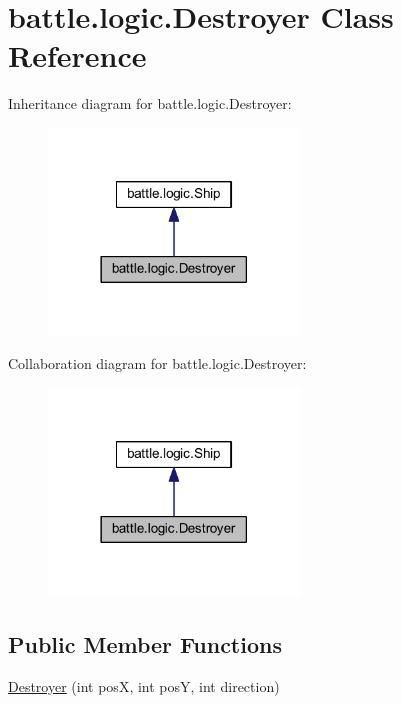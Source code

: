 \hypertarget{classbattle_1_1logic_1_1_destroyer}{}\section{battle.\+logic.\+Destroyer Class Reference}
\label{classbattle_1_1logic_1_1_destroyer}


Inheritance diagram for battle.\+logic.\+Destroyer\+:
\nopagebreak
\begin{figure}[H]
\begin{center}
\leavevmode
\includegraphics[width=189pt]{classbattle_1_1logic_1_1_destroyer__inherit__graph}
\end{center}
\end{figure}


Collaboration diagram for battle.\+logic.\+Destroyer\+:
\nopagebreak
\begin{figure}[H]
\begin{center}
\leavevmode
\includegraphics[width=189pt]{classbattle_1_1logic_1_1_destroyer__coll__graph}
\end{center}
\end{figure}
\subsection*{Public Member Functions}
\begin{DoxyCompactItemize}
\item 
\hyperlink{classbattle_1_1logic_1_1_destroyer_a6a06621703b783f47f93012eeb223ba8}{Destroyer} (int pos\+X, int pos\+Y, int direction)
\end{DoxyCompactItemize}


